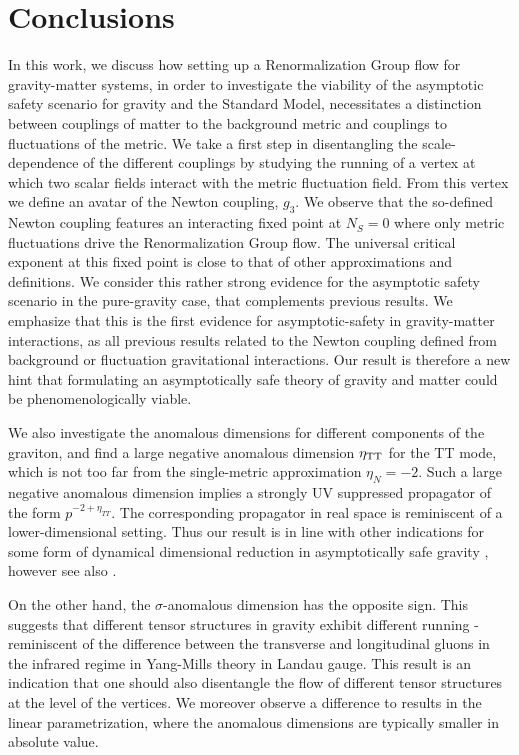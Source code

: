 \documentclass[11pt]{book} %
\begin{document}
%
\section{Conclusions}
%
In this work, we discuss how setting up a Renormalization Group flow for gravity-matter systems, in order to investigate the viability of the asymptotic safety scenario for gravity and the Standard Model, necessitates a distinction between couplings of matter to the background metric and couplings to fluctuations of the metric. We take a first step in disentangling the scale-dependence of the different couplings by studying the running of a vertex at which two scalar fields interact with the metric fluctuation field. From this vertex we define an avatar of the Newton coupling, $g_3$.
We observe that the so-defined Newton coupling features an interacting fixed point at $N_S=0$ where only metric fluctuations drive the Renormalization Group flow. The universal critical exponent at this fixed point is close to that of other approximations and definitions. We consider this rather strong evidence for the asymptotic safety scenario  in the pure-gravity case, that complements previous results. We emphasize that this is the first evidence for asymptotic-safety in gravity-matter interactions, as all previous results related to the Newton coupling defined from background or fluctuation gravitational interactions. Our result is therefore a new hint that formulating an asymptotically safe theory of gravity and matter could be phenomenologically viable.\newline

We also investigate the anomalous dimensions for different components of the graviton, and find a large negative anomalous dimension $\eta_{\rm TT}$ for the TT mode, which is not too far from the single-metric approximation $\eta_N=-2$.  Such a large negative anomalous dimension implies a strongly UV suppressed propagator of the form
$p^{-2+\eta_{TT}}$. The corresponding propagator in real space is reminiscent of a lower-dimensional setting. Thus our result is in line with other indications for some form of dynamical dimensional reduction in asymptotically safe gravity   \cite{Lauscher:2001ya, Lauscher:2005qz,Reuter:2011ah,Rechenberger:2012pm,Calcagni:2013vsa}, however see also \cite{D'Odorico:2015lhd}.

On the other hand, the  $\sigma$-anomalous dimension has the opposite sign. This suggests that different tensor structures in gravity exhibit different running - reminiscent of the difference between the transverse and longitudinal gluons in the infrared regime in Yang-Mills theory in Landau gauge.
This result is an indication that one should also disentangle the flow of different tensor structures at the level of the vertices.
We moreover observe a difference to results in the linear parametrization, where the anomalous dimensions are typically smaller in  absolute value.
\end{document}
